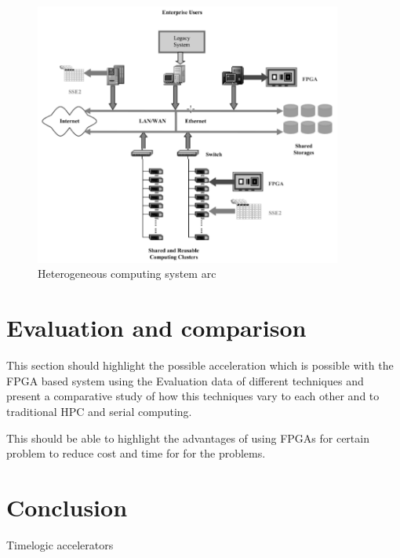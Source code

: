 \documentclass[12pt,twoside]{article}
\begin{document}
\begin{figure}%
    \centering
    \includegraphics[width=0.9\textwidth]{fig/hetero}
    \caption{Heterogeneous computing system arc \cite[Figure 1]{meng_high-performance_2010}}
    \label{fig:hetero}
\end{figure}

\section{Evaluation and comparison}
\label{sec:eval}

This section should highlight the possible acceleration which is possible with the FPGA based system
using the Evaluation data of different techniques and present a comparative study of how this techniques
vary to each other and to traditional HPC and serial computing.

This should be able to highlight the advantages of using FPGAs for certain problem to reduce cost and time for
for the problems.

\section{Conclusion}
\label{sec:concl}

Timelogic accelerators

\printbibliography
\end{document}
